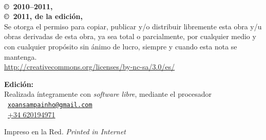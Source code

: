 \noindent
\textbf{\titlename}\\
\authorname

\footnotesize

\bigskip\bigskip\noindent
\textbf{\copyright\ 2010--2011, \authorname}\\
\textbf{\copyright\ 2011, de la edición, \editorname}\\
Se otorga el permiso para copiar, publicar y/o distribuir libremente esta obra y/u obras derivadas de esta obra, ya sea total o parcialmente, por cualquier medio y con cualquier propósito sin ánimo de lucro, siempre y cuando esta nota se mantenga.\\
{\selectfont\url{http://creativecommons.org/licenses/by-nc-sa/3.0/es/}}

\normalsize

\noindent\ccbyncsaeu

\footnotesize

\bigskip\noindent
\textbf{Edición:} \editorname\\
Realizada íntegramente con \emph{software libre}, mediante el procesador \LaTeXe\\
\Letter\ {\selectfont\href{mailto:xoansampainho@gmail.com}{\nolinkurl{xoansampainho@gmail.com}}}\\
\Telefon\ \href{tel:+34620194971}{+34 620194971}

\bigskip\noindent
Impreso en la Red. \emph{Printed in Internet}

\normalsize

\endinput
